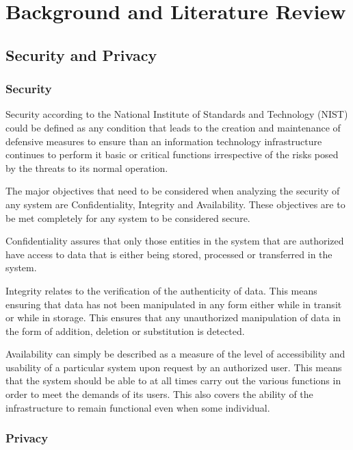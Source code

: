 \chapter{Background and Literature Review}
\label{chap:background_literature_review}

\section{Security and Privacy}

\subsection*{Security}
Security according to the National Institute of Standards and Technology (NIST) \cite{Kissel2013} could be defined as any condition that leads to the creation and maintenance of defensive measures to ensure than an information technology infrastructure continues to perform it basic or critical functions irrespective of the risks posed by the threats to its normal operation.

The major objectives that need to be considered when analyzing the security of any system are Confidentiality, Integrity and Availability. These objectives are to be met completely for any system to be considered secure.

Confidentiality \cite{Kissel2013} assures that only those entities in the system that are authorized have access to data that is either being stored, processed or transferred in the system.

Integrity \cite{Kissel2013} relates to the verification of the authenticity of data. This means ensuring that data has not been manipulated in any form either while in transit or while in storage. This ensures that any unauthorized manipulation of data in the form of addition, deletion or substitution is detected.

Availability \cite{Kissel2013} can simply be described as a measure of the level of accessibility and usability of a particular system upon request by an authorized user. This means that the system should be able to at all times carry out the various functions in order to meet the demands of its users. This also covers the ability of the infrastructure to remain functional even when some individual.

\subsection*{Privacy}

